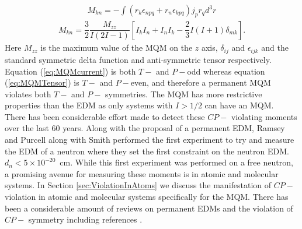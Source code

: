 \documentclass[10pt,a4paper, twoside, openright]{report}
\begin{document}
\begin{align} \label{eq:MQMcurrent}
M_{kn} = - \int \left( r_k \epsilon_{npq} + r_n\epsilon_{kpq} \right)j_pr_q d^3r
\end{align}
\begin{align} \label{eq:MQMTensor}
M_{kn} = \dfrac{3}{2}\dfrac{M_{zz}}{I(2I-1)}\left[I_{k}I_{n} + I_{n}I_{k} - \dfrac{2}{3}I(I+1)\delta_{mk}\right].
\end{align}
Here $M_{zz}$ is the maximum value of the MQM on the $z$ axis, $\delta_{ij}$ and $\epsilon_{ijk}$ and the standard symmetric delta function and anti-symmetric tensor respectively. Equation (\ref{eq:MQMcurrent}) is both $T-$ and $P-$odd whereas equation (\ref{eq:MQMTensor}) is $T-$ and $P-$even, and therefore a permanent MQM violates both $T-$ and $P-$ symmetries. The MQM has more restrictive properties than the EDM as only systems with $I>1/2$ can have an MQM.\\
\linebreak
There has been considerable effort made to detect these $CP-$ violating moments over the last 60 years. Along with the proposal of a permanent EDM, Ramsey and Purcell along with Smith performed the first experiment to try and measure the EDM of a neutron \cite{Smith1957} where they set the first constraint on the neutron EDM. $d_n < 5 \times 10^{-20}$~cm. While this first experiment was performed on a free neutron, a promising avenue for measuring these moments is in atomic and molecular systems. In Section \ref{sec:ViolationInAtoms} we discuss the manifestation of $CP-$ violation in atomic and molecular systems specifically for the MQM. There has been a considerable amount of reviews on permanent EDMs and the violation of $CP-$ symmetry including references \cite{Barr1993, KhriplovichCP, GingesReview, Pospelov2005, LeptonMoments, Fukuyama2012, Engel2013, Jungmann2013, Roberts2015, Yamanaka2017, Safronova2018, Chupp2019}.
\end{document}
